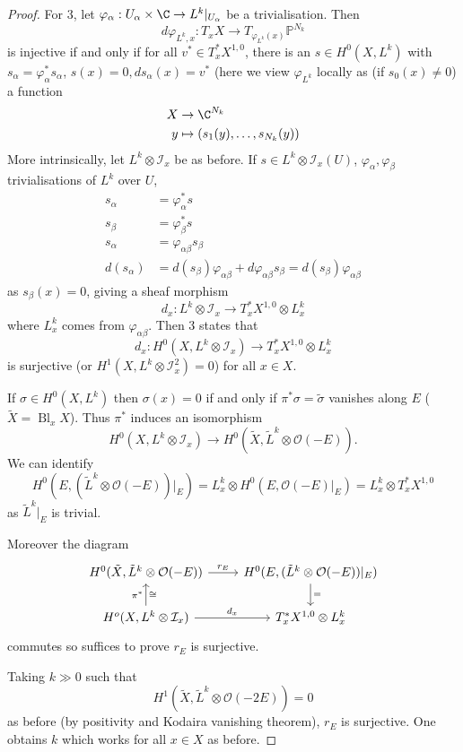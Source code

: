 \documentclass[a4paper]{article}
\renewcommand{\P}{\mathbb P} %
\DeclareMathOperator{\Bl}{Bl} %
\begin{document}
\begin{proof}
  For 3, let \(\varphi_\alpha: U_\alpha \times \C \to L^k|_{U_\alpha}\) be a trivialisation. Then
  \[
    d \varphi_{L^k, x}: T_xX \to T_{\varphi_{L^k}(x)} \P^{N_k}
  \]
  is injective if and only if for all \(v^* \in T_x^*X^{1, 0}\), there is an \(s \in H^0(X, L^k)\) with \(s_\alpha = \varphi_\alpha^*s_\alpha\), \(s(x) = 0, d s_\alpha(x) = v^*\) (here we view \(\varphi_{L^k}\) locally as (if \(s_0(x) \neq 0\)) a function
  \begin{align*}
    X &\to \C^{N_k} \\
    y &\mapsto (s_1(y), \dots, s_{N_k}(y))
  \end{align*}
  More intrinsically, let \(L^k \otimes \mathcal I_x\) be as before. If \(s \in L^k \otimes \mathcal I_x(U)\), \(\varphi_\alpha, \varphi_\beta\) trivialisations of \(L^k\) over \(U\),
  \begin{align*}
    s_\alpha &= \varphi_\alpha^* s \\
    s_\beta &= \varphi_\beta^* s \\
    s_\alpha &= \varphi_{\alpha \beta} s_\beta \\
    d(s_\alpha) &= d(s_\beta) \varphi_{\alpha \beta} + d \varphi_{\alpha\beta} s_\beta = d(s_\beta) \varphi_{\alpha\beta}
  \end{align*}
  as \(s_\beta(x) = 0\), giving a sheaf morphism
  \[
    d_x: L^k \otimes \mathcal I_x \to T_x^*X^{1, 0} \otimes L_x^k
  \]
  where \(L^k_x\) comes from \(\varphi_{\alpha\beta}\). Then 3 states that
  \[
    d_x: H^0(X, L^k \otimes \mathcal I_x) \to T_x^*X^{1, 0} \otimes L_x^k
  \]
  is surjective (or \(H^1(X, L^k \otimes \mathcal I_x^2) = 0\)) for all \(x \in X\).

  If \(\sigma \in H^0(X, L^k)\) then \(\sigma(x) = 0\) if and only if \(\pi^* \sigma = \tilde \sigma\) vanishes along \(E\) (\(\tilde X = \Bl_x X\)). Thus \(\pi^*\) induces an isomorphism
  \[
    H^0(X, L^k \otimes \mathcal I_x) \to H^0(\tilde X, \tilde L^k \otimes \mathcal O(-E)).
  \]
  We can identify
  \[
    H^0(E, (\tilde L^k \otimes \mathcal O(-E))|_E)
    = L^k_x \otimes H^0(E, \mathcal O(-E)|_E)
    = L^k_x \otimes T_x^* X^{1, 0}
  \]
  as \(\tilde L^k|_E\) is trivial.

  Moreover the diagram
  \[
    \begin{tikzcd}
      H^0(\tilde X, \tilde L^k \otimes \mathcal O(-E)) \ar[r, "r_E"] & H^0 (E, (\tilde L^k \otimes \mathcal O(-E))|_E) \ar[d, "="] \\
      H^o(X, L^k \otimes \mathcal I_x) \ar[r, "d_x"] \ar[u, "\pi^*", "\cong"'] & T_x^*X^{1, 0} \otimes L^k_x
    \end{tikzcd}
  \]
  commutes so suffices to prove \(r_E\) is surjective.

  Taking \(k \gg 0\) such that
  \[
    H^1(\tilde X, \tilde L^k \otimes \mathcal O(-2E)) = 0
  \]
  as before (by positivity and Kodaira vanishing theorem), \(r_E\) is surjective. One obtains \(k\) which works for all \(x \in X\) as before.
\end{proof}
\end{document}
